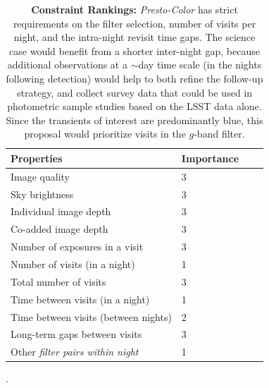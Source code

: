 \documentclass[12pt, letterpaper]{article}
\begin{document}
\vspace{.3in}

\begin{table}[ht]
    \centering
    \begin{tabular}{|l|l|l|l}
        \toprule
        Properties & Importance \hspace{.3in} \\
        \midrule
        Image quality &   3  \\
        Sky brightness &  3\\
        Individual image depth & 3  \\
        Co-added image depth &   3\\
        Number of exposures in a visit   &  3 \\
        Number of visits (in a night)  &  1 \\ 
        Total number of visits &   3\\
        Time between visits (in a night) & 1 \\
        Time between visits (between nights)  & 2  \\
        Long-term gaps between visits & 3\\
        Other \emph{filter pairs within night} & 1 \\
        \bottomrule
    \end{tabular}
    \caption{{\bf Constraint Rankings:} {\em Presto-Color} has strict requirements on the filter selection, number of visits per night, and the intra-night revisit time gaps. The science case would benefit from a shorter inter-night gap, because additional observations at a $\sim$day time scale (in the nights following detection) would help to both refine the follow-up strategy, and collect survey data that could be used in photometric sample studies based on the LSST data alone. Since the transients of interest are predominantly blue, this proposal would prioritize visits in the $g$-band filter.}.
        \label{tab:obs_constraints}
\end{table}
\end{document}
